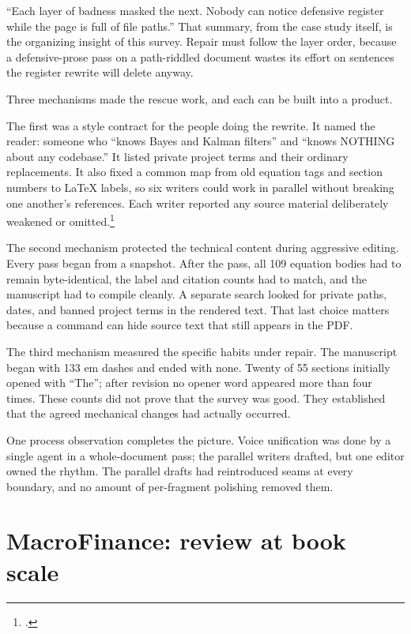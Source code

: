 ``Each layer of badness masked the next. Nobody can notice defensive
register while the page is full of file paths.'' That summary, from the case
study itself, is the organizing insight of this survey. Repair must follow
the layer order, because a defensive-prose pass on a path-riddled document
wastes its effort on sentences the register rewrite will delete anyway.

Three mechanisms made the rescue work, and each can be built into a product.

The first was a style contract for the people doing the rewrite. It named the
reader: someone who ``knows Bayes and Kalman filters'' and ``knows NOTHING about
any codebase.'' It listed private project terms and their ordinary
replacements. It also fixed a common map from old equation tags and section
numbers to LaTeX labels, so six writers could work in parallel without breaking
one another's references. Each writer reported any source material deliberately
weakened or omitted.\footnote{.}

The second mechanism protected the technical content during aggressive
editing. Every pass began from a snapshot. After the pass, all 109 equation
bodies had to remain byte-identical, the label and citation counts had to
match, and the manuscript had to compile cleanly. A separate search looked for
private paths, dates, and banned project terms in the rendered text. That last
choice matters because a command can hide source text that still appears in
the PDF.

The third mechanism measured the specific habits under repair. The manuscript
began with 133 em dashes and ended with none. Twenty of 55 sections initially
opened with ``The''; after revision no opener word appeared more than four
times. These counts did not prove that the survey was good. They established
that the agreed mechanical changes had actually occurred.

One process observation completes the picture. Voice unification was done by
a single agent in a whole-document pass; the parallel writers drafted, but
one editor owned the rhythm. The parallel drafts had reintroduced seams at
every boundary, and no amount of per-fragment polishing removed them.

\section{MacroFinance: review at book scale}
\label{sec:macrofinance}

